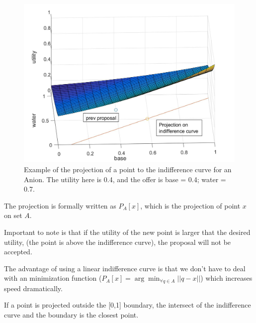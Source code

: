 \begin{figure}[h]
	\centering
	\includegraphics[width=0.7\linewidth]{img/projection_anion_example}
	\caption{Example of the projection of a point to the indifference curve for an Anion. The utility here is 0.4, and the offer is base = 0.4; water = 0.7.}
	\label{fig:projectionanionexample}
\end{figure}

The projection is formally written as $P_A[x]$, which is the projection of point $x$ on set $A$. 

Important to note is that if the utility of the new point is larger that the desired utility, (the point is above the indifference curve), the proposal will not be accepted.

The advantage of using a linear indifference curve is that we don't have to deal with an minimization function ($P_A[x] = \arg \displaystyle \min_{\forall q \in A} ||q-x||$) which increases speed dramatically.

If a point is projected outside the [0,1] boundary, the intersect of the indifference curve and the boundary is the closest point.










